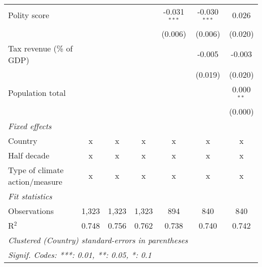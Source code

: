 \begin{tabular}{lcccccc}
   Polity score                                                 &              &               &                & -0.031$^{***}$ & -0.030$^{***}$ & 0.026\\   
                                                                &              &               &                & (0.006)        & (0.006)        & (0.020)\\   
   Tax revenue (\% of GDP)                                      &              &               &                &                & -0.005         & -0.003\\   
                                                                &              &               &                &                & (0.019)        & (0.020)\\   
   Population total                                             &              &               &                &                &                & 0.000$^{**}$\\   
                                                                &              &               &                &                &                & (0.000)\\   
   \emph{Fixed effects}\\
   Country                                                      & x            & x             & x              & x              & x              & x\\  
   Half decade                                                  & x            & x             & x              & x              & x              & x\\  
   Type of climate action/measure                               & x            & x             & x              & x              & x              & x\\  
   \midrule \emph{Fit statistics}\\
   Observations                                                 & 1,323        & 1,323         & 1,323          & 894            & 840            & 840\\  
   R$^2$                                                        & 0.748        & 0.756         & 0.762          & 0.738          & 0.740          & 0.742\\  
   \midrule
   \multicolumn{7}{l}{\emph{Clustered (Country) standard-errors in parentheses}}\\
   \multicolumn{7}{l}{\emph{Signif. Codes: ***: 0.01, **: 0.05, *: 0.1}}\\
\end{tabular}
\par\endgroup


